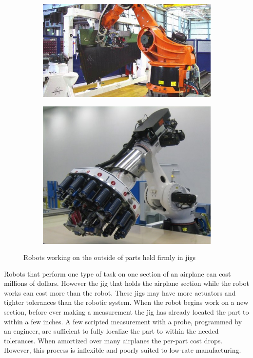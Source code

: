 \documentclass[../thesis.tex]{subfiles}
\begin{document}
\begin{figure}
  \centering
  \begin{subfigure}[b]{0.586\linewidth}
    \includegraphics[width=\linewidth]{./Introduction/Robot1Outside.jpg}    
  \end{subfigure}
  \hfill
  \begin{subfigure}[b]{0.4\linewidth}
    \includegraphics[width=\linewidth]{./Introduction/Robot2Outside.jpg}    
  \end{subfigure}
  \label{fig:KukaRobots}
  \caption{Robots working on the outside of parts held firmly in jigs}
\end{figure}

Robots that perform one type of task on one section of an airplane can cost millions of dollars.
However the jig that holds the airplane section while the robot works can cost more than the robot.
These jigs may have more actuators and tighter tolerances than the robotic system.
When the robot begins work on a new section, before ever making a measurement the jig has already located the part to within a few inches.
A few scripted measurement with a probe, programmed by an engineer, are sufficient to fully localize the part to within the needed tolerances.
When amortized over many airplanes the per-part cost drops.
However, this process is inflexible and poorly suited to low-rate manufacturing.
\end{document}
